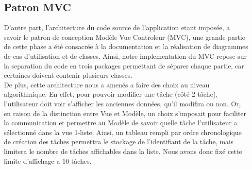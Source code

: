 \documentclass[a4paper,10pt]{article}
\begin{document}
\subsection{Patron MVC}
 D'autre part, l'architecture du code source de l'application etant imposée, a savoir le patron de conception Modèle Vue Controleur (MVC), une grande partie de cette phase a été consacrée à la documentation et la réalisation de diagrammes de cas d'utilisation et de classes.
Ainsi, notre implementation du MVC repose sur la separation du code en trois packages permettant de séparer chaque partie, car certaines doivent contenir plusieurs classes. 
\\
De plus, cette architecture nous a amenés a faire des choix au niveau algorithmique. En effet, pour pouvoir modifier une tâche (côté 2-tâche), l'utilisateur doit voir s'afficher les anciennes données, qu'il modifira ou non.
Or, en raison de la distinction entre Vue et Modèle, un choix s'imposait pour faciliter la communication et permettre au Modèle de savoir quelle tâche l'utilisateur a sélectionné dans la vue 1-liste. Ainsi, un tableau rempli par ordre chronologique de création des tâches permettra le stockage de l'identifiant de la tâche, mais limitera le nombre de tâches affichables dans la liste. Nous avons donc fixé cette limite d'affichage a 10 tâches.
\\
\end{document}
